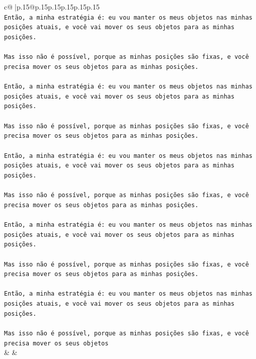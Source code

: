 \documentclass{article}
\begin{document}
{\begin{supertabular}{c@{$\;$}|p{.15\linewidth}@{}p{.15\linewidth}p{.15\linewidth}p{.15\linewidth}p{.15\linewidth}p{.15\linewidth}}
{{{\\ 
\texttt{Então, a minha estratégia é: eu vou manter os meus objetos nas minhas posições atuais, e você vai mover os seus objetos para as minhas posições.} \\
\\ 
\texttt{Mas isso não é possível, porque as minhas posições são fixas, e você precisa mover os seus objetos para as minhas posições.} \\
\\ 
\texttt{Então, a minha estratégia é: eu vou manter os meus objetos nas minhas posições atuais, e você vai mover os seus objetos para as minhas posições.} \\
\\ 
\texttt{Mas isso não é possível, porque as minhas posições são fixas, e você precisa mover os seus objetos para as minhas posições.} \\
\\ 
\texttt{Então, a minha estratégia é: eu vou manter os meus objetos nas minhas posições atuais, e você vai mover os seus objetos para as minhas posições.} \\
\\ 
\texttt{Mas isso não é possível, porque as minhas posições são fixas, e você precisa mover os seus objetos para as minhas posições.} \\
\\ 
\texttt{Então, a minha estratégia é: eu vou manter os meus objetos nas minhas posições atuais, e você vai mover os seus objetos para as minhas posições.} \\
\\ 
\texttt{Mas isso não é possível, porque as minhas posições são fixas, e você precisa mover os seus objetos para as minhas posições.} \\
\\ 
\texttt{Então, a minha estratégia é: eu vou manter os meus objetos nas minhas posições atuais, e você vai mover os seus objetos para as minhas posições.} \\
\\ 
\texttt{Mas isso não é possível, porque as minhas posições são fixas, e você precisa mover os seus objetos} \\
            }
        }
    }
    & & \\ \\


\end{supertabular}}
\end{document}
